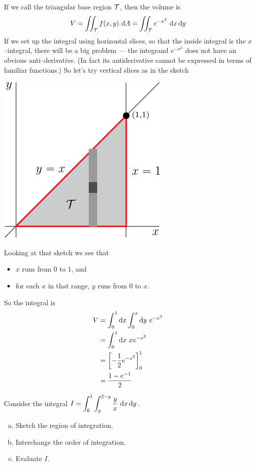 \begin{solution}
If we call the triangular base region $\mathcal{T}$, then the volume is
\begin{align*}
V=\iint_{\mathcal{T}} f(x,y)\ \mathrm{d}A = \iint_{\mathcal{T}} e^{-x^2}\ \mathrm{d}x\,\mathrm{d}y
\end{align*}
If we set up the integral using horizontal slices, so that the inside integral
is the $x$--integral, there will be a big problem --- the integrand 
$e^{-x^2}$ does not have an obvious anti--derivative. (In fact its
antiderivative cannot be expressed in terms of familiar functions.)
So let's try vertical slices as in the sketch 
\begin{center}
      \includegraphics{fig/OE09D_5.pdf}
\end{center}
Looking at that sketch we see that
\begin{itemize}
\item
$x$ runs from $0$ to $1$, and 
\item
for each $x$ in that range, $y$ runs from $0$ to $x$.
\end{itemize}
So the integral is
\begin{align*}
V&=\int_0^1\mathrm{d}x\int_0^x\mathrm{d}y\ e^{-x^2} \\
&=\int_0^1 \mathrm{d}x\ xe^{-x^2} \\
&=\left[-\frac{1}{2}e^{-x^2}\right]_0^1 \\
&=\frac{1-e^{-1}}{2}
\end{align*}

\end{solution}

\begin{question}[M200 2009D] %
Consider the integral 
   $\displaystyle I=\int_0^1 \int_y^{2-y}\frac{y}{x} \ \mathrm{d}x\,\mathrm{d}y$.

\begin{enumerate}[(a)]
\item
Sketch the region of integration.

\item 
Interchange the order of integration.

\item
Evaluate $I$.
\end{enumerate}
\end{question}

